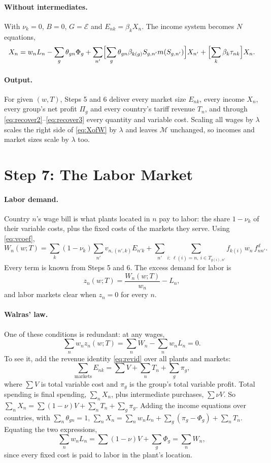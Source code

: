\documentclass[11pt]{article}
\theoremstyle{remark}
\begin{document}
\paragraph{Without intermediates.} With $\nu_k=0$, $B=0$, $G=\mathcal E$ and
$E_{nk}=\beta_kX_n$. The income system becomes $N$ equations,
\[
  X_n=w_nL_n-\sum_g\theta_{gn}\Phi_g
  +\sum_{n'}\Bigl[\sum_g\theta_{gn}\beta_{k(g)}S_{g,n'}m(S_{g,n'})\Bigr]X_{n'}
  +\Bigl[\sum_k\beta_k\tau_{nk}\Bigr]X_n .
\]

\paragraph{Output.} For given $(w,T)$, Steps 5 and 6 deliver every market size
$E_{nk}$, every income $X_n$, every group's net profit $\Pi_g$ and every country's
tariff revenue $T_n$, and through \eqref{eq:recover2}--\eqref{eq:recover3} every
quantity and variable cost. Scaling all wages by $\lambda$ scales the right side of
\eqref{eq:XofW} by $\lambda$ and leaves $\mathcal M$ unchanged, so incomes and market
sizes scale by $\lambda$ too.

\section{Step 7: The Labor Market}
\label{sec:labor}

\paragraph{Labor demand.} Country $n$'s wage bill is what plants located in $n$ pay
to labor: the share $1-\nu_k$ of their variable costs, plus the fixed costs of the
markets they serve. Using \eqref{eq:vcoef},
\begin{equation}
  W_n(w;T)=\sum_{k}(1-\nu_k)\sum_{n'}v_{n,(n',k)}E_{n'k}
  +\sum_{n'}\sum_{i:\,\ell(i)=n,\ i\in T_{g(i),n'}}f_{k(i)}\,w_n\,f^d_{nn'} .
  \label{eq:wagebill}
\end{equation}
Every term is known from Steps 5 and 6. The excess demand for labor is
\begin{equation}
  z_n(w;T)=\frac{W_n(w;T)}{w_n}-L_n,
  \label{eq:excess}
\end{equation}
and labor markets clear when $z_n=0$ for every $n$.

\paragraph{Walras' law.} One of these conditions is redundant: at any wages,
\[
  \sum_nw_nz_n(w;T)=\sum_nW_n-\sum_nw_nL_n=0 .
\]
To see it, add the revenue identity \eqref{eq:revid} over all plants and markets:
\[
  \sum_{\text{markets}}E_{nk}=\sum V+\sum_nT_n+\sum_g\pi_g ,
\]
where $\sum V$ is total variable cost and $\pi_g$ is the group's total variable profit.
Total spending is final spending, $\sum_nX_n$, plus intermediate purchases,
$\sum\nu V$. So $\sum_nX_n=\sum(1-\nu)V+\sum_nT_n+\sum_g\pi_g$. Adding the income
equations over countries, with $\sum_n\theta_{gn}=1$,
$\sum_nX_n=\sum_nw_nL_n+\sum_g(\pi_g-\Phi_g)+\sum_nT_n$. Equating the two expressions,
\[
  \sum_nw_nL_n=\sum(1-\nu)V+\sum_g\Phi_g=\sum_nW_n,
\]
since every fixed cost is paid to labor in the plant's location.
\end{document}
